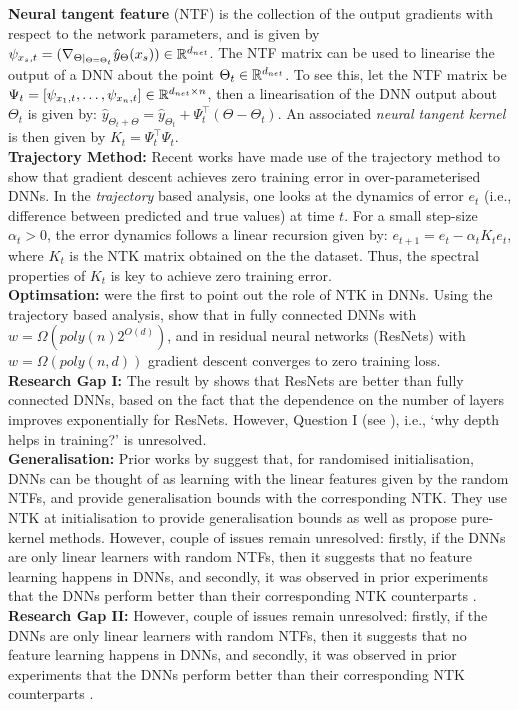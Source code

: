 \textbf{Neural tangent feature} (NTF) is the collection of the output gradients with respect to the network parameters, and is given by $\psi_{x_s,t}=(\nabla_{\Theta|_{\Theta=\Theta_t}} \hat{y}_{\Theta}(x_s))\in\mathbb{R}^{d_{net}}$.  The NTF matrix can be used to linearise the output of a DNN about the point $\Theta_t\in\mathbb{R}^{d_{net}}$. To see this, let the NTF matrix be $\Psi_t=[\psi_{x_1,t},\ldots, \psi_{x_n,t}]\in\mathbb{R}^{d_{net}\times n}$, then a linearisation of the DNN output about $\Theta_t$ is given by: $\hat{y}_{\Theta_t+\Theta}=\hat{y}_{\Theta_t} + \Psi^\top_t (\Theta-\Theta_t)$. An associated \emph{neural tangent kernel} is then given by $K_t=\Psi^\top_t\Psi_t$.\\
\textbf{Trajectory Method:} Recent works have made use of the trajectory method to show that gradient descent achieves zero training error in over-parameterised DNNs. In the \emph{trajectory} based analysis, one looks at the dynamics of error $e_t$  (i.e., difference between predicted and true values) at time $t$. For a small step-size $\alpha_t>0$, the error dynamics follows a linear recursion given by: $e_{t+1}=e_t-\alpha_tK_te_t$, where $K_t$ is the NTK matrix obtained on the the dataset. Thus, the spectral properties of $K_t$ is key to achieve zero training error. \hfill\\
\textbf{Optimsation:} \cite{ntk} were the first to point out the role of NTK in DNNs. Using the trajectory based analysis, \cite{dudnn} show that in fully connected DNNs with $w=\Omega(poly(n)2^{O(d)})$, and in residual neural networks (ResNets) with $w=\Omega(poly(n,d))$ gradient descent converges to zero training loss.\\
\textbf{Research Gap I:} The result by \cite{dudnn} shows that ResNets are better than fully connected DNNs, based on the fact that the dependence on the number of layers improves exponentially for ResNets. However, Question I (see ), i.e., `why depth helps in training?' is unresolved.\\
\textbf{Generalisation:} Prior works by \cite{arora2019exact,cao2019generalization} suggest that, for randomised initialisation, DNNs can be thought of as learning with the linear features given by the random NTFs, and provide generalisation bounds with the corresponding NTK. They use NTK at initialisation to provide generalisation bounds as well as propose pure-kernel methods. However, couple of issues remain unresolved: firstly, if the DNNs are only linear learners with random NTFs, then it suggests that no feature learning happens in DNNs, and secondly, it was observed in prior experiments that the DNNs perform better than their corresponding NTK counterparts \cite{arora2019exact,lee2017deep}. \hfill\\
\textbf{Research Gap II:} However, couple of issues remain unresolved: firstly, if the DNNs are only linear learners with random NTFs, then it suggests that no feature learning happens in DNNs, and secondly, it was observed in prior experiments that the DNNs perform better than their corresponding NTK counterparts \cite{arora2019exact,lee2017deep}.

